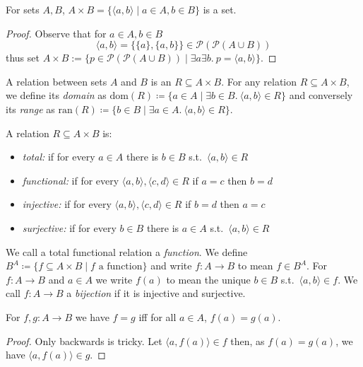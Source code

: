 \documentclass{whrartcl}
\newcommand{\pow}{\mathcal{P}}
\newcommand{\dom}{\text{dom}}
\newcommand{\ran}{\text{ran}}
\begin{document}
\begin{proposition}
  For sets $A, B$, $A \times B = \{\langle a, b \rangle \mid a \in A, b \in B\}$
  is a set.
\end{proposition}
\begin{proof}
  Observe that for $a \in A, b \in B$
  \[
    \langle a, b \rangle = \{\{a\}, \{a, b\}\} \in \pow(\pow(A \cup B))
  \]
  thus set $A \times B := \{p \in \pow(\pow(A \cup B))\mid \exists a
  \exists b.~p = \langle a, b \rangle\}$.
\end{proof}

\begin{definition}
  A relation between sets $A$ and $B$ is an $R \subseteq A \times B$. For any
  relation $R \subseteq A \times B$, we define its \emph{domain} as $\dom(R)
  \coloneq \{a \in A \mid \exists b \in B.~\langle a, b \rangle \in R\}$ and
  conversely its \emph{range} as $\ran(R) \coloneq \{b \in B \mid \exists a \in
  A.~ \langle a, b \rangle \in R\}$.

  A relation $R \subseteq A \times B$ is:
  \begin{itemize}
  \item \emph{total:} if for every $a \in A$ there is $b \in B$ s.t.\ $\langle
    a, b \rangle \in R$
  \item \emph{functional:} if for every $\langle a, b \rangle, \langle c, d
    \rangle \in R$ if $a = c$ then $b = d$
  \item \emph{injective:} if for every $\langle a, b \rangle, \langle c, d
    \rangle \in R$ if $b = d$ then $a = c$
  \item \emph{surjective:} if for every $b \in B$ there is $a \in A$ s.t.\
    $\langle a, b \rangle \in R$
  \end{itemize}
  We call a total functional relation a \emph{function}. We define $B^A \coloneq
  \{f \subseteq A \times B \mid f \text{ a function}\}$ and write $f : A \to B$
  to mean $f \in B^A$. For $f : A \to B$ and $a \in A$ we write $f(a)$ to mean
  the unique $b \in B$ s.t.\ $\langle a, b \rangle \in f$.
  We call $f : A \to B$ a \emph{bijection} if it is injective and surjective.
\end{definition}

\begin{proposition}
  For $f, g : A \to B$ we have $f = g$ iff for all $a \in A$, $f(a) = g(a)$.
\end{proposition}
\begin{proof}
  Only backwards is tricky. Let $\langle a, f(a) \rangle \in f$ then, as $f(a) =
  g(a)$, we have $\langle a, f(a) \rangle \in g$.
\end{proof}
\end{document}

